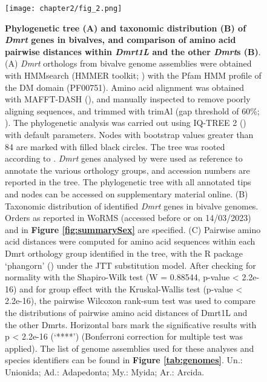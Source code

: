 \documentclass[../main.tex]{subfiles}
\begin{document}
\begin{figure}
    \centering
    \texttt{[image: chapter2/fig\_2.png]}
    \captionsetup{width=\textwidth}
    \caption[font=sf]{
    \textbf{Phylogenetic tree (A) and taxonomic distribution (B) of \textit{Dmrt} genes in bivalves, and comparison of amino acid pairwise distances within \textit{Dmrt1L} and the other \textit{Dmrt}s (B)}. (A) \textit{Dmrt} orthologs from bivalve genome assemblies were obtained with HMMsearch (HMMER toolkit; \textbf{\cite{eddy2011accelerated}}) with the Pfam HMM profile of the DM domain (PF00751). Amino acid alignment was obtained with MAFFT-DASH (\textbf{\cite{rozewicki2019mafft}}), and manually inspected to remove poorly aligning sequences, and trimmed with trimAl (gap threshold of 60\%; \textbf{\cite{capella2009trimal}}). The phylogenetic analysis was carried out using IQ-TREE 2 (\textbf{\cite{minh2020iq}}) with default parameters. Nodes with bootstrap values greater than 84 are marked with filled black circles. The tree was rooted according to \textbf{\cite{evensen2022comparative}}. \textit{Dmrt} genes analysed by \textbf{\cite{evensen2022comparative}} were used as reference to annotate the various orthology groups, and accession numbers are reported in the tree. The phylogenetic tree with all annotated tips and nodes can be accessed on supplementary material online. (B) Taxonomic distribution of identified \textit{Dmrt} genes in bivalve genomes. Orders as reported in WoRMS (accessed before or on 14/03/2023) and in \textbf{Figure \ref{fig:summarySex}} are specified. (C) Pairwise amino acid distances were computed for amino acid sequences within each Dmrt orthology group identified in the tree, with the R package ‘phangorn’ (\textbf{\cite{schliep2011phangorn}}) under the JTT substitution model. After checking for normality with the Shapiro-Wilk test (W = 0.88544, p-value < 2.2e-16) and for group effect with the Kruskal-Wallis test (p-value < 2.2e-16), the pairwise Wilcoxon rank-sum test was used to compare the distributions of pairwise amino acid distances of Dmrt1L and the other Dmrts. Horizontal bars mark the significative results with p < 2.2e-16 (‘****’) (Bonferroni correction for multiple test was applied). The list of genome assemblies used for these analyses and species identifiers can be found in \textbf{Figure \ref{tab:genomes}}. Un.: Unionida; Ad.: Adapedonta; My.: Myida; Ar.: Arcida.
    }
    
    \label{fig:dmrt}
\end{figure}
\end{document}
